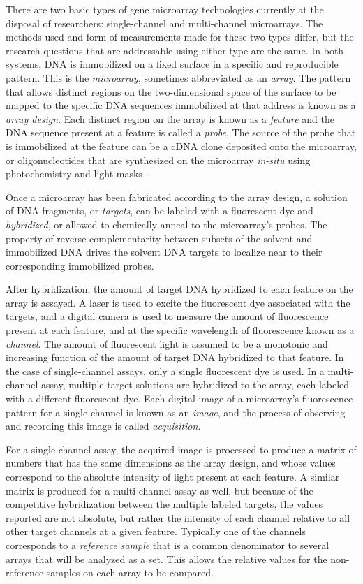 There are two basic types of gene microarray technologies currently at the
disposal of researchers: single-channel and multi-channel microarrays.  The
methods used and form of measurements made for these two types differ, but the
research questions that are addressable using either type are the same.  In
both systems, DNA is immobilized on a fixed surface in a specific and
reproducible pattern.  This is the \emph{microarray}, sometimes abbreviated as
an \emph{array}.  The pattern that allows distinct regions on the
two-dimensional space of the surface to be mapped to the specific DNA sequences
immobilized at that address is known as a \emph{array design}.  Each distinct
region on the array is known as a \emph{feature} and the DNA sequence present
at a feature is called a \emph{probe}.  The source of the probe that is
immobilized at the feature can be a cDNA clone deposited onto the microarray,
or oligonucleotides that are synthesized on the microarray \emph{in-situ} using
photochemistry and light masks \cite{XXX}.

Once a microarray has been fabricated according to the array design, a solution
of DNA fragments, or \emph{targets}, can be labeled with a fluorescent dye and
\emph{hybridized}, or allowed to chemically anneal to the microarray's probes.
The property of reverse complementarity between subsets of the solvent and
immobilized DNA drives the solvent DNA targets to localize near to their
corresponding immobilized probes.

After hybridization, the amount of target DNA hybridized to each feature on the
array is assayed.  A laser is used to excite the fluorescent dye associated
with the targets, and a digital camera is used to measure the amount of
fluorescence present at each feature, and at the specific wavelength of
fluorescence known as a \emph{channel}.  The amount of fluorescent light is
assumed to be a monotonic and increasing function of the amount of target DNA
hybridized to that feature.  In the case of single-channel assays, only a
single fluorescent dye is used.  In a multi-channel assay, multiple target
solutions are hybridized to the array, each labeled with a different
fluorescent dye.  Each digital image of a microarray's fluorescence pattern for
a single channel is known as an \emph{image}, and the process of observing and
recording this image is called \emph{acquisition}.

For a single-channel assay, the acquired image is processed to produce a matrix
of numbers that has the same dimensions as the array design, and whose values
correspond to the absolute intensity of light present at each feature.  A
similar matrix is produced for a multi-channel assay as well, but because of
the competitive hybridization between the multiple labeled targets, the values
reported are not absolute, but rather the intensity of each channel relative to
all other target channels at a given feature.  Typically one of the channels
corresponds to a \emph{reference sample} that is a common denominator to
several arrays that will be analyzed as a set.  This allows the relative values
for the non-reference samples on each array to be compared.

